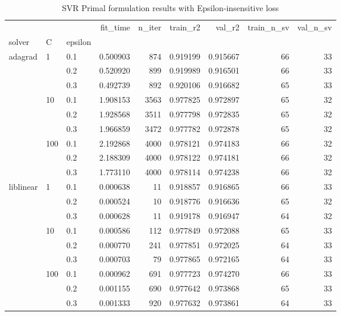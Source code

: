 \begin{table}[h!]
\centering
\caption{SVR Primal formulation results with Epsilon-insensitive loss}
\label{primal_svr_eps_cv_results}
\begin{tabular}{lllrrrrrr}
\toprule
          &     &     &  fit\_time &  n\_iter &  train\_r2 &    val\_r2 &  train\_n\_sv &  val\_n\_sv \\
solver & C & epsilon &           &         &           &           &             &           \\
\midrule
adagrad & 1   & 0.1 &  0.500903 &     874 &  0.919199 &  0.915667 &          66 &        33 \\
          &     & 0.2 &  0.520920 &     899 &  0.919989 &  0.916501 &          66 &        33 \\
          &     & 0.3 &  0.492739 &     892 &  0.920106 &  0.916682 &          65 &        33 \\
          & 10  & 0.1 &  1.908153 &    3563 &  0.977825 &  0.972897 &          65 &        32 \\
          &     & 0.2 &  1.928568 &    3511 &  0.977798 &  0.972835 &          65 &        32 \\
          &     & 0.3 &  1.966859 &    3472 &  0.977782 &  0.972878 &          65 &        32 \\
          & 100 & 0.1 &  2.192868 &    4000 &  0.978121 &  0.974183 &          66 &        32 \\
          &     & 0.2 &  2.188309 &    4000 &  0.978122 &  0.974181 &          66 &        32 \\
          &     & 0.3 &  1.773110 &    4000 &  0.978114 &  0.974238 &          66 &        32 \\
liblinear & 1   & 0.1 &  0.000638 &      11 &  0.918857 &  0.916865 &          66 &        33 \\
          &     & 0.2 &  0.000524 &      10 &  0.918776 &  0.916636 &          65 &        32 \\
          &     & 0.3 &  0.000628 &      11 &  0.919178 &  0.916947 &          64 &        32 \\
          & 10  & 0.1 &  0.000586 &     112 &  0.977849 &  0.972088 &          65 &        33 \\
          &     & 0.2 &  0.000770 &     241 &  0.977851 &  0.972025 &          64 &        33 \\
          &     & 0.3 &  0.000703 &      79 &  0.977865 &  0.972165 &          64 &        33 \\
          & 100 & 0.1 &  0.000962 &     691 &  0.977723 &  0.974270 &          66 &        33 \\
          &     & 0.2 &  0.001155 &     690 &  0.977642 &  0.973868 &          65 &        33 \\
          &     & 0.3 &  0.001333 &     920 &  0.977632 &  0.973861 &          64 &        33 \\
\bottomrule
\end{tabular}
\end{table}
